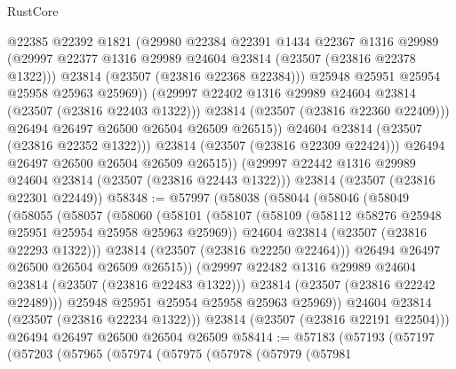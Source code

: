 \begin{lexlean}{RustCore}
\begin{coremodule}
                      @22385
                      @22392
                      @1821
                      (@29980
                        @22384
                        @22391
                        @1434
                        @22367
                        @1316
                        @29989
                        (@29997 @22377 @1316 @29989 @24604 @23814 (@23507 (@23816 @22378 @1322)))
                        @23814
                        (@23507 (@23816 @22368 @22384)))
                      @25948
                      @25951
                      @25954
                      @25958
                      @25963
                      @25969))
                  (@29997 @22402 @1316 @29989 @24604 @23814 (@23507 (@23816 @22403 @1322)))
                  @23814
                  (@23507 (@23816 @22360 @22409)))
                @26494
                @26497
                @26500
                @26504
                @26509
                @26515))
            @24604
            @23814
            (@23507 (@23816 @22352 @1322)))
          @23814
          (@23507 (@23816 @22309 @22424)))
        @26494
        @26497
        @26500
        @26504
        @26509
        @26515))
    (@29997 @22442 @1316 @29989 @24604 @23814 (@23507 (@23816 @22443 @1322)))
    @23814
    (@23507 (@23816 @22301 @22449))
@58348 := @57997
    (@58038
      (@58044
        (@58046
          (@58049
            (@58055
              (@58057
                (@58060
                  (@58101
                    (@58107
                      (@58109 (@58112 @58276 @25948 @25951 @25954 @25958 @25963 @25969))
                      @24604
                      @23814
                      (@23507 (@23816 @22293 @1322)))
                    @23814
                    (@23507 (@23816 @22250 @22464)))
                  @26494
                  @26497
                  @26500
                  @26504
                  @26509
                  @26515))
              (@29997 @22482 @1316 @29989 @24604 @23814 (@23507 (@23816 @22483 @1322)))
              @23814
              (@23507 (@23816 @22242 @22489)))
            @25948
            @25951
            @25954
            @25958
            @25963
            @25969))
        @24604
        @23814
        (@23507 (@23816 @22234 @1322)))
      @23814
      (@23507 (@23816 @22191 @22504)))
    @26494
    @26497
    @26500
    @26504
    @26509
@58414 := @57183
    (@57193
      (@57197
        (@57203
          (@57965
            (@57974
              (@57975
                (@57978
                  (@57979
                    (@57981

\end{coremodule}
\end{lexlean}
